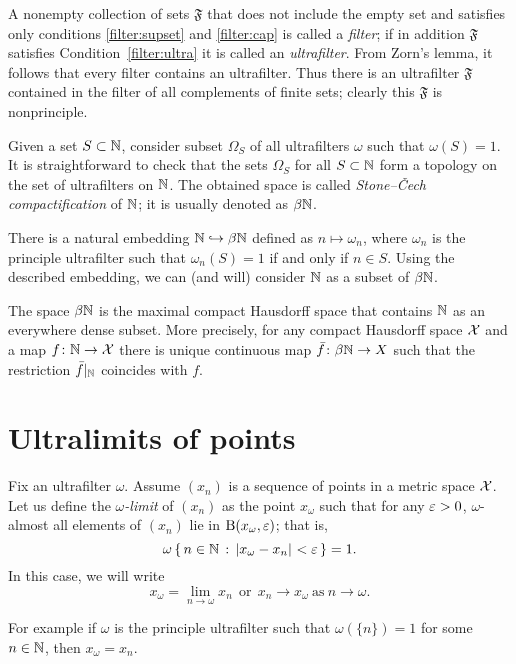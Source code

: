 A nonempty collection of sets $\mathfrak{F}$ that does not include the empty set and satisfies only conditions \ref{filter:supset} and \ref{filter:cap} is called a \emph{filter}; 
if in addition $\mathfrak{F}$ satisfies Condition~\ref{filter:ultra} it is called an \emph{ultrafilter}.
From Zorn's lemma, it follows that every filter contains an ultrafilter.
Thus there is an ultrafilter $\mathfrak{F}$ contained in the filter of all complements of finite sets; clearly this $\mathfrak{F}$ is nonprinciple.


Given a set $S\subset \mathbb{N}$, consider subset $\Omega_S$ of all ultrafilters $\omega$ such that $\omega(S)=1$.
It is straightforward to check that the sets $\Omega_S$ for all $S\subset \mathbb{N}$ form a topology on the set of ultrafilters on $\mathbb{N}$. 
The obtained space is called \emph{Stone--\v{C}ech compactification} of $\mathbb{N}$;
it is usually denoted as $\beta\mathbb{N}$.

There is a natural embedding $\mathbb{N}\hookrightarrow\beta\mathbb{N}$ defined as
$n\mapsto\omega_n$, where $\omega_n$ is the principle ultrafilter such that $\omega_n(S)=1$ if and only if $n\in S$. 
Using the described embedding, we can (and will) consider $\mathbb{N}$ as a subset of $\beta\mathbb{N}$.

The space $\beta\mathbb{N}$ is the maximal compact Hausdorff space that contains $\mathbb{N}$  as an everywhere dense subset.
More precisely, for any compact Hausdorff space $\mathcal{X}$ 
and a map $f\colon\mathbb{N}\to \mathcal{X}$ there is unique continuous map $\bar f\colon\beta\mathbb{N}\to X$ such that the restriction $\bar f|_{\mathbb{N}}$ coincides with $f$. 

\section{Ultralimits of points}
\label{ultralimits}

Fix an ultrafilter $\omega$.
Assume $(x_n)$ is a sequence of points in a metric space $\mathcal{X}$. 
Let us define the \emph{$\omega$-limit} of $(x_n)$ as the point $x_\omega$ 
such that for any $\varepsilon>0$, $\omega$-almost all elements of $(x_n)$ lie in $\mathrm{B}{}(x_\omega,\varepsilon)$; 
that is,
\[\omega\set{n\in\NN}{\dist{x_\omega}{x_n}{}<\eps}=1.\]
In this case, we will write 
\[x_\omega=\lim_{n\to\omega} x_n
\ \ \text{or}\ \ 
x_n\to x_\omega\ \text{as}\ n\to\omega.\]

For example if $\omega$ is the principle ultrafilter such that $\omega(\{n\})=1$ for some $n\in\mathbb{N}$, then
$x_\omega=x_n$.

